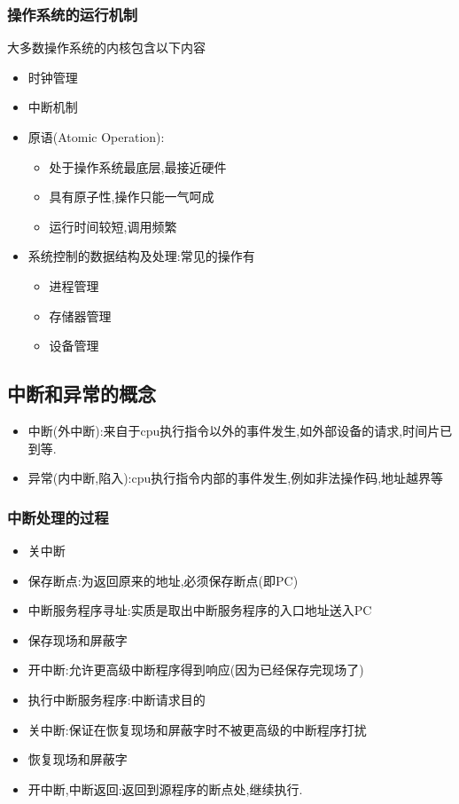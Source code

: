 \documentclass{ctexart}
\begin{document}
\subsubsection{操作系统的运行机制}
大多数操作系统的内核包含以下内容
\begin{itemize}
	\item 时钟管理
	\item 中断机制
	\item 原语(Atomic Operation):
	      \begin{itemize}
		      \item 处于操作系统最底层,最接近硬件
		      \item 具有原子性,操作只能一气呵成
		      \item 运行时间较短,调用频繁
	      \end{itemize}
	\item 系统控制的数据结构及处理:常见的操作有
	      \begin{itemize}
		      \item 进程管理
		      \item 存储器管理
		      \item 设备管理
	      \end{itemize}
\end{itemize}

\subsection{中断和异常的概念}
\begin{itemize}
	\item 中断(外中断):来自于cpu执行指令以外的事件发生,如外部设备的请求,时间片已到等.
	\item 异常(内中断,陷入):cpu执行指令内部的事件发生,例如非法操作码,地址越界等
\end{itemize}
\subsubsection{中断处理的过程}
\begin{itemize}
	\item 关中断
	\item 保存断点:为返回原来的地址,必须保存断点(即PC)
	\item 中断服务程序寻址:实质是取出中断服务程序的入口地址送入PC
	\item 保存现场和屏蔽字
	\item 开中断:允许更高级中断程序得到响应(因为已经保存完现场了)
	\item 执行中断服务程序:中断请求目的
	\item 关中断:保证在恢复现场和屏蔽字时不被更高级的中断程序打扰
	\item 恢复现场和屏蔽字
	\item 开中断,中断返回:返回到源程序的断点处,继续执行.
\end{itemize}
\end{document}
